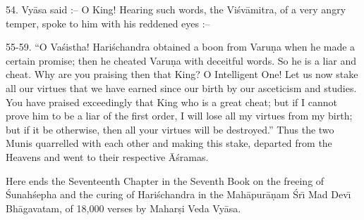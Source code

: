 54. Vy\=asa said :-- O King! Hearing such words, the Vi\'sv\=amitra, of a very angry temper, spoke to him with his reddened eyes :--

55-59. ``O Va\'sistha! Hari\'schandra obtained a boon from Varu\d{n}a when he made a certain promise; then he cheated Varu\d{n}a with deceitful words. So he is a liar and cheat. Why are you praising then that King? O Intelligent One! Let us now stake all our virtues that we have earned since our birth by our asceticism and studies. You have praised exceedingly that King who is a great cheat; but if I cannot prove him to be a liar of the first order, I will lose all my virtues from my birth; but if it be otherwise, then all your virtues will be destroyed.'' Thus the two Munis quarrelled with each other and making this stake, departed from the Heavens and went to their respective \=A\'sramas.

Here ends the Seventeenth Chapter in the Seventh Book on the freeing of \'Sunah\'sepha and the curing of Hari\'schandra in the Mah\=apur\=a\d{n}am \'Sr\={\i} Mad Dev\={\i} Bh\=agavatam, of 18,000 verses by Mahar\d{s}i Veda Vy\=asa.




